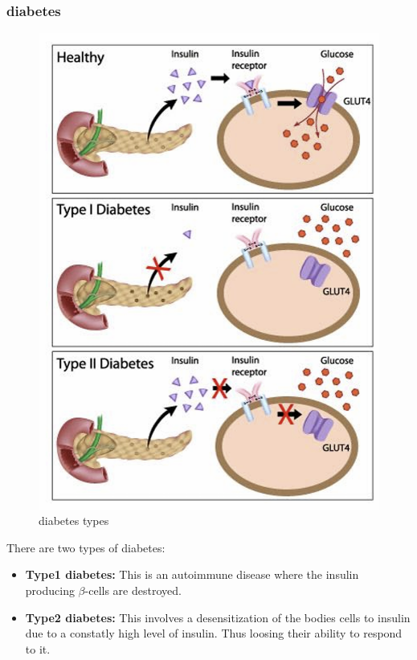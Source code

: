 \documentclass[../main.tex]{subfiles}
\begin{document}
\subsubsection{diabetes}
\begin{figure}[H]
    \centering
    \includegraphics[width=0.5\linewidth]{diabetes.png}
    \caption{diabetes types}
    \label{fig:enter-label}
\end{figure}
There are two types of diabetes:
\begin{itemize}
    \item \textbf{Type1 diabetes:} This is an autoimmune disease where the insulin producing $\beta$-cells are destroyed. 
    \item \textbf{Type2 diabetes:} This involves a desensitization of the bodies cells to insulin due to a constatly high level of insulin. Thus loosing their ability to respond to it.
\end{itemize}
\end{document}
